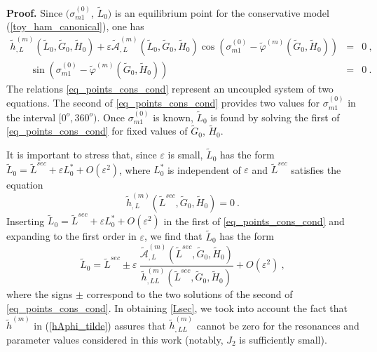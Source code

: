 \documentclass[12pt,reqno]{amsart}
\numberwithin{equation}{section}
\newcommand\beqa[1]{ \begin{eqnarray} \label{#1}}
\newcommand{\eeqa}{ \end{eqnarray} }
\newcommand\equ[1]{{\rm (\ref{#1})}}
\begin{document}
{\bf Proof.} Since  $(\sigma_{m1}^{(0)}$, $\widetilde{L}_0)$ is an equilibrium point for the conservative
model \equ{toy_ham_canonical}, one has
\beqa{eq_points_cons_cond}
\widetilde{h}_{,L}^{(m)}(\widetilde{L}_0, \widetilde{G}_0, \widetilde{H}_0)+
\varepsilon \widetilde{\mathcal{A}}_{,L}^{(m)}(\widetilde{L}_0, \widetilde{G}_0, \widetilde{H}_0)
\cos (\sigma_{m1}^{(0)}-\widetilde{\varphi}^{(m)}( \widetilde{G}_0, \widetilde{H}_0))&=&0\ ,\nonumber\\
\qquad \sin(\sigma_{m1}^{(0)}-\widetilde{\varphi}^{(m)}( \widetilde{G}_0, \widetilde{H}_0))&=&0\ .
\eeqa
The relations \eqref{eq_points_cons_cond} represent an uncoupled system of two equations. The second of \eqref{eq_points_cons_cond} provides two values for $\sigma_{m1}^{(0)}$ in the interval $[0^o, 360^o)$. Once $\sigma_{m1}^{(0)}$ is known, $\widetilde{L}_0$ is found
by solving the first of \eqref{eq_points_cons_cond} for fixed values of $\widetilde{G}_0$, $\widetilde{H}_0$.

It is important to stress that, since $\varepsilon$ is small,  $\widetilde{L}_0$ has the form
$ \widetilde{L}_{0}=\widetilde{L}^{sec} + \varepsilon L_0^* +O(\varepsilon^2)$, where $ L_0^*$ is independent of $\varepsilon$ and
 $\widetilde{L}^{sec}$ satisfies the equation
$$\widetilde{h}_{,L}^{(m)}(\widetilde{L}^{sec}, \widetilde{G}_0, \widetilde{H}_0)=0\ .$$
Inserting $ \widetilde{L}_{0}=\widetilde{L}^{sec} + \varepsilon L_0^* +O(\varepsilon^2)$ in the first of \eqref{eq_points_cons_cond} and expanding to the first order in $\varepsilon$,
we find that  $\widetilde{L}_0$ has the form
\begin{equation}\label{Lsec}
 \widetilde{L}_{0}=\widetilde{L}^{sec} \pm \varepsilon \ \frac{\widetilde{\mathcal{A}}_{,L}^{(m)}
 (\widetilde{L}^{sec}, \widetilde{G}_0, \widetilde{H}_0)}{\widetilde{h}_{,LL}^{(m)}(\widetilde{L}^{sec}, \widetilde{G}_0, \widetilde{H}_0)} +O(\varepsilon^2)\ ,
\end{equation}
where  the signs $\pm$ correspond to the two solutions of the second of \eqref{eq_points_cons_cond}.
In obtaining \eqref{Lsec},  we took into account the fact that $\widetilde{h}^{(m)}$ in \equ{hAphi_tilde} assures that $\widetilde{h}_{,LL}^{(m)}$ cannot be zero for the resonances
and parameter values considered in this work (notably, $J_2$ is sufficiently small).
\end{document}
